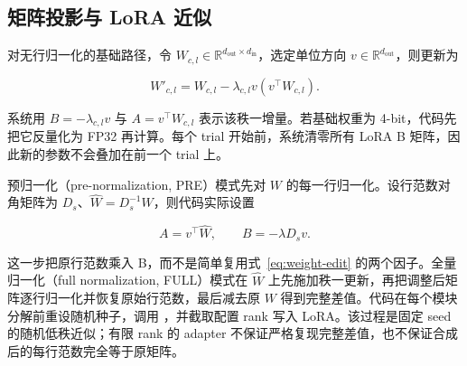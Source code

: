 \subsection{矩阵投影与 LoRA 近似}

对无行归一化的基础路径，令 $W_{c,l}\in\mathbb{R}^{d_{\mathrm{out}}\times d_{\mathrm{in}}}$，选定单位方向 $v\in\mathbb{R}^{d_{\mathrm{out}}}$，则更新为

\begin{equation}
W'_{c,l}=W_{c,l}-\lambda_{c,l}v(v^{\top}W_{c,l}).
\label{eq:weight-edit}
\end{equation}

系统用 $B=-\lambda_{c,l}v$ 与 $A=v^{\top}W_{c,l}$ 表示该秩一增量。若基础权重为 4-bit，代码先把它反量化为 FP32 再计算。每个 trial 开始前，系统清零所有 LoRA B 矩阵，因此新的参数不会叠加在前一个 trial 上。

预归一化（pre-normalization, PRE）模式先对 $W$ 的每一行归一化。设行范数对角矩阵为 $D_s$、$\widehat W=D_s^{-1}W$，则代码实际设置

\begin{equation}
A=v^{\top}\widehat W,\qquad B=-\lambda D_s v.
\label{eq:pre}
\end{equation}

这一步把原行范数乘入 B，而不是简单复用式~\eqref{eq:weight-edit} 的两个因子。全量归一化（full normalization, FULL）模式在 $\widehat W$ 上先施加秩一更新，再把调整后矩阵逐行归一化并恢复原始行范数，最后减去原 $W$ 得到完整差值。代码在每个模块分解前重设随机种子，调用 ，并截取配置 rank 写入 LoRA。该过程是固定 seed 的随机低秩近似；有限 rank 的 adapter 不保证严格复现完整差值，也不保证合成后的每行范数完全等于原矩阵。
